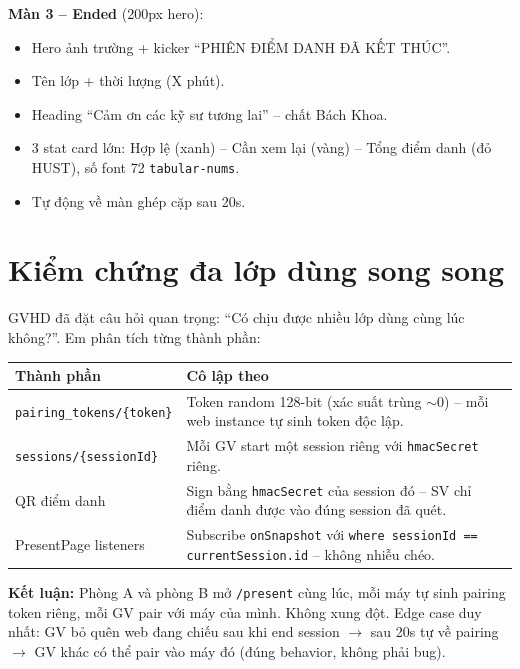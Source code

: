 \documentclass{article}
\begin{document}
\textbf{Màn 3 -- Ended} (200px hero):

\begin{itemize}[leftmargin=1.5em]
  \item Hero ảnh trường + kicker ``PHIÊN ĐIỂM DANH ĐÃ KẾT THÚC''.
  \item Tên lớp + thời lượng (X phút).
  \item Heading ``Cảm ơn các \textcolor{hustred}{kỹ sư tương lai}'' -- chất Bách Khoa.
  \item 3 stat card lớn: Hợp lệ (xanh) -- Cần xem lại (vàng) -- Tổng điểm danh (đỏ HUST), số font 72 \texttt{tabular-nums}.
  \item Tự động về màn ghép cặp sau 20s.
\end{itemize}

\section{Kiểm chứng đa lớp dùng song song}

GVHD đã đặt câu hỏi quan trọng: ``Có chịu được nhiều lớp dùng cùng lúc không?''. Em phân tích từng thành phần:

\begin{center}
\begin{tabularx}{\textwidth}{@{}l X@{}}
\toprule
\textbf{Thành phần} & \textbf{Cô lập theo} \\
\midrule
\texttt{pairing\_tokens/\{token\}} & Token random 128-bit (xác suất trùng $\sim 0$) -- mỗi web instance tự sinh token độc lập. \\
\addlinespace
\texttt{sessions/\{sessionId\}} & Mỗi GV start một session riêng với \texttt{hmacSecret} riêng. \\
\addlinespace
QR điểm danh & Sign bằng \texttt{hmacSecret} của session đó -- SV chỉ điểm danh được vào đúng session đã quét. \\
\addlinespace
PresentPage listeners & Subscribe \texttt{onSnapshot} với \texttt{where sessionId == currentSession.id} -- không nhiễu chéo. \\
\bottomrule
\end{tabularx}
\end{center}

\textbf{Kết luận:} Phòng A và phòng B mở \texttt{/present} cùng lúc, mỗi máy tự sinh pairing token riêng, mỗi GV pair với máy của mình. Không xung đột. Edge case duy nhất: GV bỏ quên web đang chiếu sau khi end session $\to$ sau 20s tự về pairing $\to$ GV khác có thể pair vào máy đó (đúng behavior, không phải bug).
\end{document}
